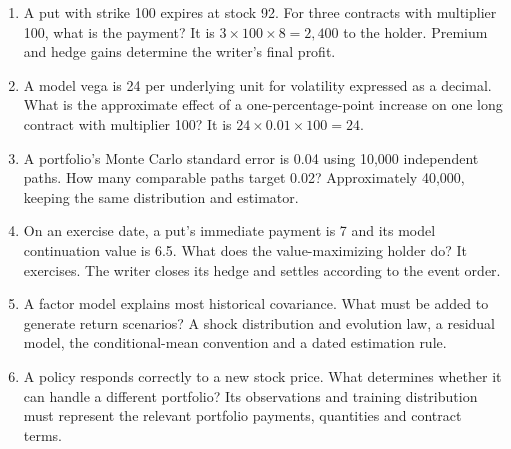 \documentclass[8pt]{strategynet-journal}
\begin{document}
\begin{SNcolumns}
\begin{enumerate}[leftmargin=1.5em]
\item\begin{minipage}[t]{\linewidth}A put with strike 100 expires at stock 92. For three contracts with
multiplier 100, what is the payment? It is $3\times100\times8=2{,}400$ to
the holder. Premium and hedge gains determine the writer's final profit.
\end{minipage}\par
\item\begin{minipage}[t]{\linewidth}A model vega is 24 per underlying unit for volatility expressed as a
decimal. What is the approximate effect of a one-percentage-point increase
on one long contract with multiplier 100? It is $24\times0.01\times100=24$.
\end{minipage}\par
\item\begin{minipage}[t]{\linewidth}A portfolio's Monte Carlo standard error is 0.04 using 10,000 independent
paths. How many comparable paths target 0.02? Approximately 40,000, keeping
the same distribution and estimator.
\end{minipage}\par
\item\begin{minipage}[t]{\linewidth}On an exercise date, a put's immediate payment is 7 and its model
continuation value is 6.5. What does the value-maximizing holder do? It
exercises. The writer closes its hedge and settles according to the event order.
\end{minipage}\par
\item\begin{minipage}[t]{\linewidth}A factor model explains most historical covariance. What must be added
to generate return scenarios? A shock distribution and evolution law,
a residual model, the conditional-mean convention and a dated estimation rule.
\end{minipage}\par
\item\begin{minipage}[t]{\linewidth}A policy responds correctly to a new stock price. What determines whether
it can handle a different portfolio? Its observations and training distribution
must represent the relevant portfolio payments, quantities and contract terms.
\end{minipage}\par
\end{enumerate}


\end{SNcolumns}
\end{document}
